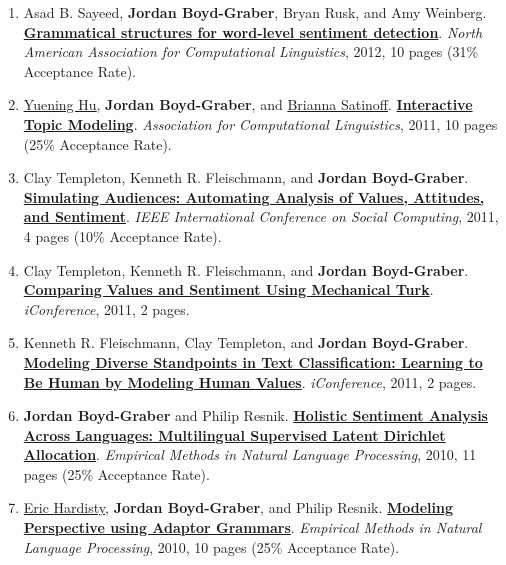 {\begin{enumerate}
	 \item Asad B. Sayeed, {\bf Jordan Boyd-Graber}, Bryan Rusk, and Amy Weinberg.  {\bf \href{http://cs.umd.edu/~jbg//docs/srt_naacl_2012.pdf}{Grammatical structures for word-level sentiment detection}}.  \emph{North American Association for Computational Linguistics}, 2012, 10 pages (31\% Acceptance Rate).

	 \item \underline{\href{https://scholar.google.com/citations?user=mO_62fQAAAAJ&hl=en}{Yuening Hu}}, {\bf Jordan Boyd-Graber}, and \underline{Brianna Satinoff}.  {\bf \href{http://cs.umd.edu/~jbg//docs/itm.pdf}{Interactive Topic Modeling}}.  \emph{Association for Computational Linguistics}, 2011, 10 pages (25\% Acceptance Rate).

	 \item Clay Templeton, Kenneth R. Fleischmann, and {\bf Jordan Boyd-Graber}.  {\bf \href{http://cs.umd.edu/~jbg//docs/simulating_audiences.pdf}{Simulating Audiences: Automating Analysis of Values, Attitudes, and Sentiment}}.  \emph{IEEE International Conference on Social Computing}, 2011, 4 pages (10\% Acceptance Rate).

	 \item Clay Templeton, Kenneth R. Fleischmann, and {\bf Jordan Boyd-Graber}.  {\bf \href{http://cs.umd.edu/~jbg//docs/iconference-2011-comparing.pdf}{Comparing Values and Sentiment Using Mechanical Turk}}.  \emph{iConference}, 2011, 2 pages.

	 \item Kenneth R. Fleischmann, Clay Templeton, and {\bf Jordan Boyd-Graber}.  {\bf \href{http://cs.umd.edu/~jbg//docs/iconference-2011-learning.pdf}{Modeling Diverse Standpoints in Text Classification: Learning to Be Human by Modeling Human Values}}.  \emph{iConference}, 2011, 2 pages.

	 \item {\bf Jordan Boyd-Graber} and Philip Resnik.  {\bf \href{http://cs.umd.edu/~jbg//docs/jbg-mlslda-2010.pdf}{Holistic Sentiment Analysis Across Languages: Multilingual Supervised Latent Dirichlet Allocation}}.  \emph{Empirical Methods in Natural Language Processing}, 2010, 11 pages (25\% Acceptance Rate).

	 \item \underline{Eric Hardisty}, {\bf Jordan Boyd-Graber}, and Philip Resnik.  {\bf \href{http://cs.umd.edu/~jbg//docs/adapted_naive_bayes.pdf}{Modeling Perspective using Adaptor Grammars}}.  \emph{Empirical Methods in Natural Language Processing}, 2010, 10 pages (25\% Acceptance Rate).


\end{enumerate}}
